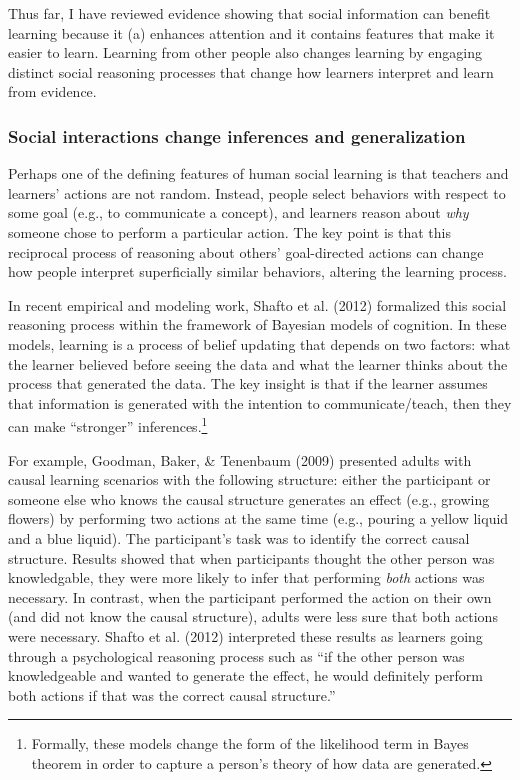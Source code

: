 \documentclass[a4paper,man,apacite,floatsintext]{apa6}
\begin{document}
Thus far, I have reviewed evidence showing that social information can
benefit learning because it (a) enhances attention and it contains
features that make it easier to learn. Learning from other people also
changes learning by engaging distinct social reasoning processes that
change how learners interpret and learn from evidence.

\subsubsection{Social interactions change inferences and
generalization}\label{social-interactions-change-inferences-and-generalization}

Perhaps one of the defining features of human social learning is that
teachers and learners' actions are not random. Instead, people select
behaviors with respect to some goal (e.g., to communicate a concept),
and learners reason about \emph{why} someone chose to perform a
particular action. The key point is that this reciprocal process of
reasoning about others' goal-directed actions can change how people
interpret superficially similar behaviors, altering the learning
process.

In recent empirical and modeling work, Shafto et al. (2012) formalized
this social reasoning process within the framework of Bayesian models of
cognition. In these models, learning is a process of belief updating
that depends on two factors: what the learner believed before seeing the
data and what the learner thinks about the process that generated the
data. The key insight is that if the learner assumes that information is
generated with the intention to communicate/teach, then they can make
``stronger'' inferences.\footnote{Formally, these models change the form
  of the likelihood term in Bayes theorem in order to capture a person's
  theory of how data are generated.}

For example, Goodman, Baker, \& Tenenbaum (2009) presented adults with
causal learning scenarios with the following structure: either the
participant or someone else who knows the causal structure generates an
effect (e.g., growing flowers) by performing two actions at the same
time (e.g., pouring a yellow liquid and a blue liquid). The
participant's task was to identify the correct causal structure. Results
showed that when participants thought the other person was knowledgable,
they were more likely to infer that performing \emph{both} actions was
necessary. In contrast, when the participant performed the action on
their own (and did not know the causal structure), adults were less sure
that both actions were necessary. Shafto et al. (2012) interpreted these
results as learners going through a psychological reasoning process such
as ``if the other person was knowledgeable and wanted to generate the
effect, he would definitely perform both actions if that was the correct
causal structure.''
\end{document}

